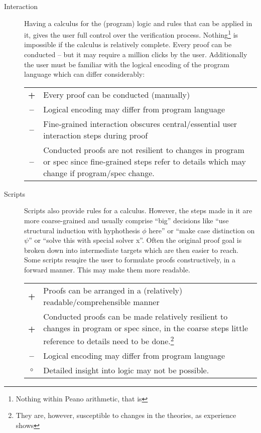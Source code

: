 \documentclass{article}
\newcommand{\plus}{\textbf{+}}
\newcommand{\minus}{\textbf{--}}
\newcommand{\undecided}{\boldmath$\circ$}
\begin{document}
\begin{description}
\item[Interaction] Having a calculus for the (program) logic and rules
  that can be applied in it, gives the user full control over the
  verification process. Nothing\footnote{Nothing within Peano
    arithmetic, that is} is impossible if the calculus is relatively
  complete. Every proof can be conducted -- but it may require a
  million clicks by the user. Additionally the user must be familiar
  with the logical encoding of the program language which can differ
  considerably:\\
  \begin{tabularx}{\linewidth}{cX}
    \plus & Every proof can be conducted (manually) \\
    \minus & Logical encoding may differ from program language \\
    \minus & Fine-grained interaction obscures central/essential user
    interaction steps during proof \\
    \minus & Conducted proofs are not resilient to changes in program
    or spec since fine-grained steps refer to details which may change
    if program/spec change.
  \end{tabularx}

\item[Scripts] Scripts also provide rules for a calculus. However, the
  steps made in it are more coarse-grained and usually comprise
  ``big'' decisions like ``use structural induction with hyphothesis
  $\phi$ here'' or ``make case distinction on $\psi$'' or ``solve this
  with special solver x''. Often the original proof goal is broken
  down into intermediate targets which are then easier to reach. Some
  scripts reuqire the user to formulate proofs constructively, in a
  forward manner. This may make them more readable.\\
  \begin{tabularx}{\linewidth}{cX}
    \plus & Proofs can be arranged in a (relatively)
    readable/comprehensible manner\\
    \plus & Conducted proofs can be made relatively resilient to
    changes in program or spec since, in the coarse steps little
    reference to details need to be done.\footnote{They are, however,
      susceptible to changes in the theories, as experience shows}\\
    \minus & Logical encoding may differ from program language\\
    \undecided & Detailed insight into logic may not be possible.
  \end{tabularx}


\end{description}
\end{document}
